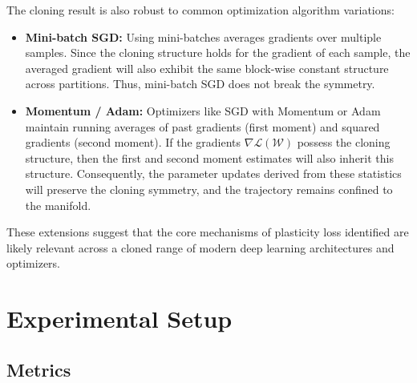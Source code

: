 \documentclass{article}
\newcommand{\Loss}{\mathcal{L}}
\begin{document}
The cloning result is also robust to common optimization algorithm variations:
\begin{itemize}
    \item \textbf{Mini-batch SGD:} Using mini-batches averages gradients over multiple samples. Since the cloning structure holds for the gradient of each sample, the averaged gradient will also exhibit the same block-wise constant structure across partitions. Thus, mini-batch SGD does not break the symmetry.
    \item \textbf{Momentum / Adam:} Optimizers like SGD with Momentum or Adam maintain running averages of past gradients (first moment) and squared gradients (second moment). If the gradients $\nabla\Loss(\mathcal{W})$ possess the cloning structure, then the first and second moment estimates will also inherit this structure. Consequently, the parameter updates derived from these statistics will preserve the cloning symmetry, and the trajectory remains confined to the manifold.
\end{itemize}
These extensions suggest that the core mechanisms of plasticity loss identified are likely relevant across a cloned range of modern deep learning architectures and optimizers.

\section{Experimental Setup}

\subsection{Metrics}

\newpage
\end{document}
